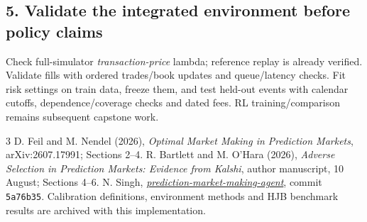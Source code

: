 \documentclass[11pt,letterpaper]{article}
\begin{document}
\subsection{5. Validate the integrated environment before policy claims}
Check full-simulator \emph{transaction-price} lambda; reference replay is already verified. Validate fills with ordered trades/book updates and queue/latency checks. Fit risk settings on train data, freeze them, and test held-out events with calendar cutoffs, dependence/coverage checks and dated fees. RL training/comparison remains subsequent capstone work.

{\fontsize{8.5}{10.2}\selectfont
\renewcommand{\refname}{Sources and reproducibility}
\begin{thebibliography}{3}
\setlength{\itemsep}{1pt}\setlength{\parskip}{0pt}
 D. Feil and M. Nendel (2026), \emph{Optimal Market Making in Prediction Markets}, arXiv:2607.17991; Sections 2--4.
 R. Bartlett and M. O'Hara (2026), \emph{Adverse Selection in Prediction Markets: Evidence from Kalshi}, author manuscript, 10 August; Sections 4--6.
 N. Singh, \href{https://github.com/naveenkr12/prediction-market-making-agent/tree/5a76b35de7af8e56553d30ccee0a559641390ee5}{\emph{prediction-market-making-agent}}, commit \texttt{5a76b35}. Calibration definitions, environment methods and HJB benchmark results are archived with this implementation.
\end{thebibliography}}
\end{document}
